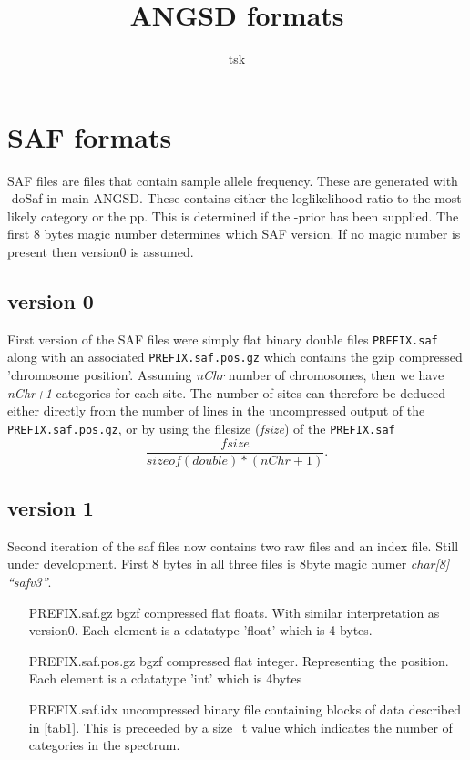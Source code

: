 \documentclass[10pt]{article}
\begin{document}
\title{ANGSD formats}
\author{tsk}
\maketitle
\vspace*{1em}


\section{SAF formats}
SAF files are files that contain sample allele frequency. These are generated with -doSaf in main ANGSD. These contains either the loglikelihood ratio to the most likely category or the pp. This is determined if the -prior has been supplied.
The first 8 bytes magic number determines which SAF version. If no magic number is present then version0 is assumed.
\subsection{version 0}
First version of the SAF files were simply flat binary double files \texttt{PREFIX.saf} along with an associated \texttt{PREFIX.saf.pos.gz} which contains the gzip compressed 'chromosome position'. Assuming \emph{nChr} number of chromosomes, then we have \emph{nChr+1} categories for each site. The number of sites can therefore be deduced either directly from the number of lines in the uncompressed output of the \texttt{PREFIX.saf.pos.gz}, or by using the filesize (\emph{fsize}) of the \texttt{PREFIX.saf} $$\frac{fsize}{sizeof(double)*(nChr+1)}.$$
\subsection{version 1}

Second iteration of the saf files now contains two raw files and an index file. Still under development. First 8 bytes in all three files is 8byte magic numer \emph{char[8] ``safv3''}. 
\begin{itemize}
\item[PREFIX.saf.gz] bgzf compressed flat floats. With similar interpretation as version0. Each element is a cdatatype 'float' which is 4 bytes.
\item[PREFIX.saf.pos.gz] bgzf compressed flat integer. Representing the position. Each element is a cdatatype 'int' which is 4bytes
\item[PREFIX.saf.idx] uncompressed binary file containing blocks of data described in \ref{tab1}. This is preceeded by a size\_t value which indicates the number of categories in the spectrum.
\end{itemize}
\end{document}
